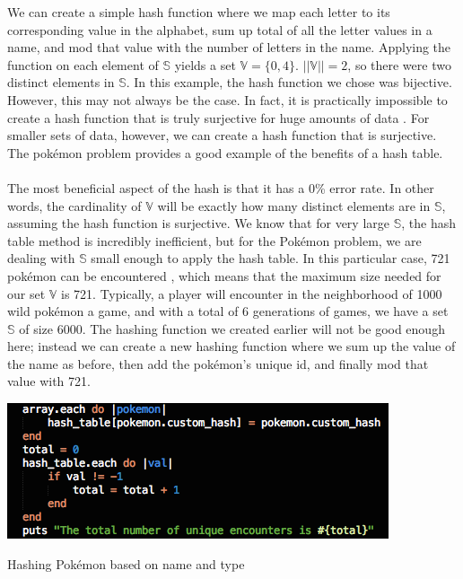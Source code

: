 \documentclass{article}
\begin{document}
We can create a simple hash function where we map each letter to its corresponding value in the alphabet, sum up total of all the letter values in a name, and mod that value with the number of letters in the name. 
Applying the function on each element of $\mathbb{S}$ yields a set $\mathbb{V} = \{0,4\}$. $||\mathbb{V}|| = 2$, so there were two distinct elements in $\mathbb{S}$. In this example, the hash function we chose was bijective.
However, this may not always be the case. In fact, it is practically impossible to create a hash function that is truly surjective for huge amounts of data \cite[p. 6]{Maurer}. 
For smaller sets of data, however, we can create a hash function that is surjective. 
The pok\'emon problem provides a good example of the benefits of a hash table.
\\\\
\indent The most beneficial aspect of the hash is that it has a 0\% error rate. 
In other words, the cardinality of $\mathbb{V}$ will be exactly how many distinct elements are in $\mathbb{S}$, assuming the hash function is surjective. 
We know that for very large $\mathbb{S}$, the hash table method is incredibly inefficient, but for the Pok\'emon problem, we are dealing with $\mathbb{S}$ small enough to apply the hash table. 
In this particular case, 721 pok\'emon can be encountered \cite{Pokemon}, which means that the maximum size needed for our set $\mathbb{V}$ is 721. 
Typically, a player will encounter in the neighborhood of 1000 wild pok\'emon a game, and with a total of 6 generations of games, we have a set $\mathbb{S}$ of size 6000. 
The hashing function we created earlier will not be good enough here; instead we can create a new hashing function where we sum up the value of the name as before, then add the pok\'emon's unique id, and finally mod that value with 721.
\begin{floatingfigure}[H!]{8cm}
\centering
\begin{framed}
\includegraphics[scale=0.4]{pkmn_problem/hash_01}
\caption{Hashing Pok\'emon based on name and type}
\end{framed}
\end{floatingfigure}
\end{document}
